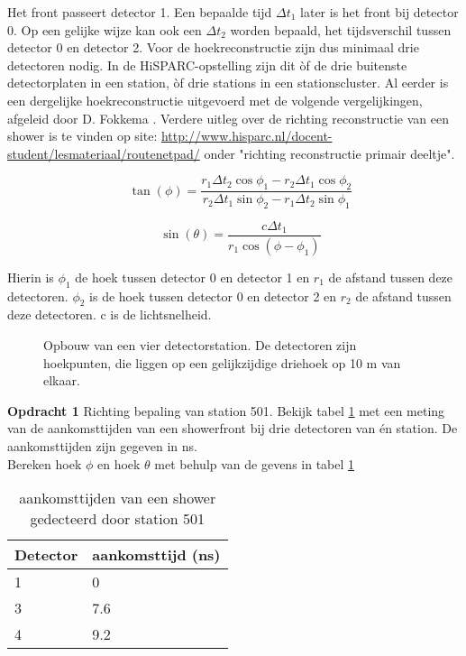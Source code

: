 Het front passeert detector 1. Een bepaalde tijd $\Delta t_{1}$ later is het front bij detector 0. Op een gelijke wijze kan ook een $\Delta t_{2}$ worden bepaald, het tijdsverschil tussen detector 0 en detector 2. Voor de hoekreconstructie zijn dus minimaal drie detectoren nodig. In de HiSPARC-opstelling zijn dit òf de drie buitenste detectorplaten in een station, òf drie stations in een stationscluster. Al eerder is een dergelijke hoekreconstructie uitgevoerd met de volgende vergelijkingen, afgeleid door D. Fokkema \cite{Fokkema}.
Verdere uitleg over de richting reconstructie van een shower is te vinden op site:
 \url{http://www.hisparc.nl/docent-student/lesmateriaal/routenetpad/} onder "richting reconstructie primair deeltje".


\begin{equation}
	   \quad \tan(\phi)= \frac{r_1\Delta t_2\cos\phi_1-r_2\Delta t_1\cos \phi_2}{r_2\Delta t_1\sin\phi_2-r_1\Delta t_2\sin \phi_1}
\end{equation}

\begin{equation}
	    \quad \sin(\theta)= \frac{c\Delta t_1}{r_1\cos(\phi-\phi_1)}
\end{equation}

Hierin is $\phi_{1}$ de hoek tussen detector 0 en detector 1 en $r_{1}$ de afstand tussen deze detectoren. $\phi_{2}$ is de hoek tussen detector 0 en detector 2 en $r_{2}$ de afstand tussen deze detectoren. c is de lichtsnelheid.



\begin{figure}
    \centering
    
    \caption{Opbouw van een vier detectorstation. De detectoren zijn hoekpunten, die  liggen op een gelijkzijdige driehoek op 10 m van elkaar.}
    \label{fig:stationlayout} 
\end{figure}


\textbf{Opdracht 1} Richting bepaling van station 501.
Bekijk tabel  \ref{tab:arrival} met een meting van de aankomsttijden van een showerfront bij drie detectoren van én station.
De aankomsttijden zijn gegeven in ns. \\
Bereken hoek $\phi$ en hoek $\theta$ met behulp van de gevens in tabel \ref{tab:arrival}


\begin{table}
\begin{center}    
\begin{tabular}{ |l |l  |}    
\hline
    Detector & aankomsttijd (ns)  \\ 
\hline
    1 & 0 \\
 \hline
    3 & 7.6  \\
 \hline
    4 & 9.2 \\ 
\hline
\end{tabular}
    \caption{ aankomsttijden van een shower gedecteerd door station 501}
 \label{tab:arrival}     
\end{center} 
\end{table}

